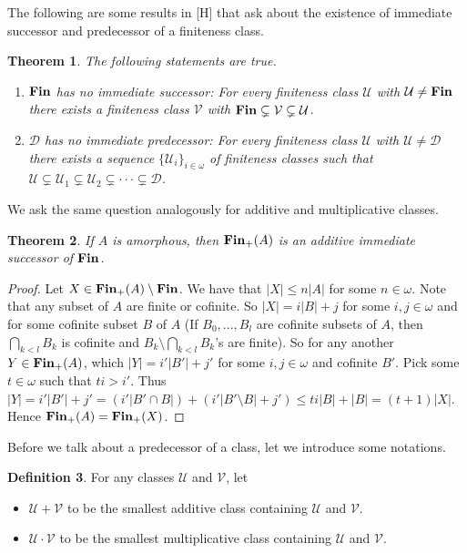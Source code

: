 \documentclass{amsart}
\newcommand{\Fin}{\textbf{\textup{Fin}}}
\renewcommand{\leq}{\leqslant}
\newcommand{\1}{\ensuremath{\mathds{1}}}
\theoremstyle{plain}
\newtheorem{thm}{Theorem}[section]
\theoremstyle{boldrk}
\theoremstyle{definition}
\newtheorem{defn}[thm]{Definition}
\begin{document}
The following are some results in [H] that ask about the existence of immediate successor and predecessor of a finiteness class.

\begin{thm} The following statements are true.
\begin{enumerate}
    \item $\Fin$ has no immediate successor: For every finiteness class $\mathcal{U}$ with $\mathcal{U}\neq\Fin$ there exists a finiteness class $\mathcal{V}$ with $\Fin\subsetneq\mathcal{V}\subsetneq\mathcal{U}$. 
    \item $\mathcal{D}$ has no immediate predecessor: For every finiteness class $\mathcal{U}$ with $\mathcal{U}\neq\mathcal{D}$ there exists a sequence $\{\mathcal{U}_{i}\}_{i\in\omega}$ of finiteness classes such that $\mathcal{U}\subsetneq\mathcal{U}_{1}\subsetneq\mathcal{U}_{2}\subsetneq\cdot\cdot\cdot\subsetneq\mathcal{D}$.
\end{enumerate}
\end{thm}

\noindent We ask the same question analogously for additive and multiplicative classes.

\begin{thm}
   If $A$ is amorphous, then $\Fin_{+}(A)$ is an additive immediate successor of $\Fin$. 
\end{thm}

\begin{proof}
Let $X\in\Fin_{+}(A)\setminus\Fin$. We have that $|X|\leq n|A|$ for some $n\in\omega$. Note that any subset of $A$ are finite or cofinite. So $|X|=i|B|+j$ for some $i,j\in\omega$ and for some cofinite subset $B$ of $A$ (If $B_{0},...,B_{l}$ are cofinite subsets of $A$, then $\bigcap_{k<l}B_{k}$ is cofinite and $B_{k}\setminus \bigcap_{k<l}B_{k}$'s are finite). So for any another $Y\in \Fin_{+}(A)$, which $|Y|=i'|B'|+j'$ for some $i,j\in\omega$ and cofinite $B'$. Pick some $t\in\omega$ such that $ti>i'$. Thus $|Y|=i'|B'|+j'=(i'|B'\cap B|)+(i'|B'\setminus B|+j')\leq ti|B|+|B|=(t+1)|X|$. Hence $\Fin_{+}(A)=\Fin_{+}(X)$.
\end{proof}

\noindent Before we talk about a predecessor of a class, let we introduce some notations.

\begin{defn}
 For any classes $\mathcal{U}$ and $\mathcal{V}$, let
 \begin{itemize}
     \item $\mathcal{U}+\mathcal{V}$ to be the smallest additive class containing $\mathcal{U}$ and $\mathcal{V}$.
     \item $\mathcal{U}\cdot\mathcal{V}$ to be the smallest multiplicative class containing $\mathcal{U}$ and $\mathcal{V}$.
 \end{itemize}
\end{defn}
\end{document}
